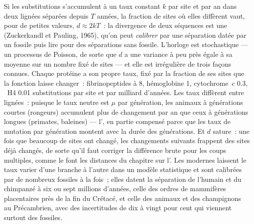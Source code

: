 \begin{proposition}\label{prop:b3:molecular-evolution:clock}
Si les substitutions s'accumulent à un taux constant $k$ par site et par
an dans deux lignées séparées depuis $T$ années, la fraction de sites où
elles diffèrent vaut, pour de petites valeurs, $d \approx 2kT$~: la
divergence de deux séquences est une \emph{}
(Zuckerkandl et Pauling, 1965), qu'on peut \emph{calibrer} par une
séparation datée par un fossile puis lire pour des séparations sans
fossile. L'horloge est stochastique --- un processus de Poisson, de
sorte que $d$ a une variance à peu près égale à sa moyenne sur un nombre
fixé de sites --- et elle est irrégulière de trois façons connues.
Chaque protéine a son propre taux, fixé par la fraction de ses sites que
la fonction laisse changer~: fibrinopeptides à \num{8}, hémoglobine
\num{1}, cytochrome~$c$ \num{0.3}, ~H4 \num{0.01} substitutions
par site et par milliard d'années. Les taux diffèrent entre lignées~:
puisque le taux neutre est $\mu$ par génération, les animaux à
générations courtes (rongeurs) accumulent plus de changement par an que
ceux à générations longues (primates, baleines) --- l'\emph{}, en partie compensé parce que les taux de mutation
par génération montent avec la durée des générations. Et $d$ sature~:
une fois que beaucoup de sites ont changé, les changements suivants
frappent des sites déjà changés, de sorte qu'il faut corriger la
différence brute pour les coups multiples, comme le font les distances
du chapitre sur l'. Les \emph{} modernes
laissent le taux varier d'une branche à l'autre dans un modèle
statistique et sont calibrées par de nombreux fossiles à la fois~; elles
datent la séparation de l'humain et du chimpanzé à six ou sept millions
d'années, celle des ordres de mammifères placentaires près de la fin du
Crétacé, et celle des animaux et des champignons au Précambrien, avec
des incertitudes de dix à vingt pour cent qui viennent surtout des
fossiles.
\end{proposition}
